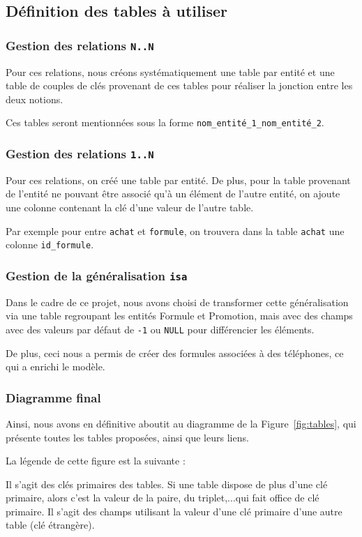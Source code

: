 \subsection{Définition des tables à utiliser}
\subsubsection{Gestion des relations \texttt{N..N}}
Pour ces relations, nous créons systématiquement une table par entité et une table de couples de clés provenant de ces tables pour réaliser la jonction entre les deux notions.

Ces tables seront mentionnées sous la forme \texttt{nom\_entité\_1\_nom\_entité\_2}.

\subsubsection{Gestion des relations \texttt{1..N}}
Pour ces relations, on créé une table par entité. De plus, pour la table provenant de l'entité ne pouvant être associé qu'à un élément de l'autre entité, on ajoute une colonne contenant la clé d'une valeur de l'autre table.

Par exemple pour entre \texttt{achat} et \texttt{formule}, on trouvera dans la table \texttt{achat} une colonne \texttt{id\_formule}.

\subsubsection{Gestion de la généralisation \texttt{isa}}
Dans le cadre de ce projet, nous avons choisi de transformer cette généralisation via une table regroupant les entités \og Formule\fg{} et \og Promotion\fg{}, mais avec des champs avec des valeurs par défaut de \texttt{-1} ou \texttt{NULL} pour différencier les éléments.

De plus, ceci nous a permis de créer des formules associées à des téléphones, ce qui a enrichi le modèle.

\subsubsection{Diagramme final}
Ainsi, nous avons en définitive aboutit au diagramme de la Figure~\ref{fig:tables}, qui présente toutes les tables proposées, ainsi que leurs liens.

La légende de cette figure est la suivante :
\begin{itemize}
  \itemperso{\bddkey}Il s'agit des clés primaires des tables. Si une table dispose de plus d'une clé primaire, alors c'est la valeur de la paire, du triplet,...qui fait office de clé primaire.
  \itemperso{\bddfkey}Il s'agit des champs utilisant la valeur d'une clé primaire d'une autre table (clé étrangère).
\end{itemize}

